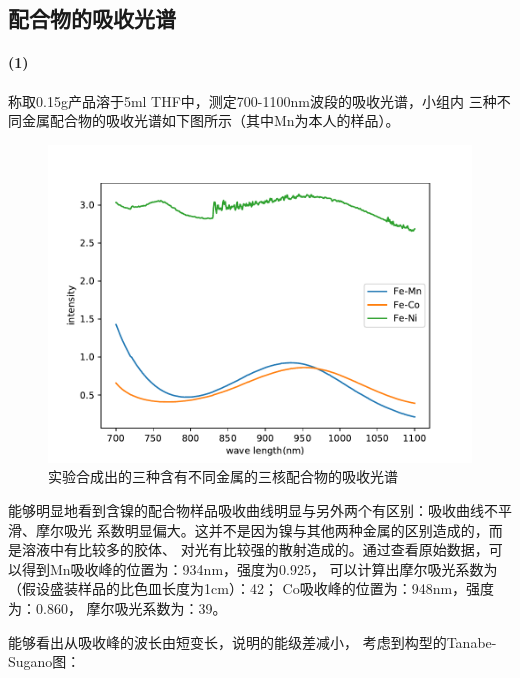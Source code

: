 \documentclass[a4paper,zihao=5,UTF8]{ctexart}
\begin{document}
	\subsection{配合物的吸收光谱}
	\paragraph{(1)}称取0.15g产品溶于5ml THF中，测定700-1100nm波段的吸收光谱，小组内
	三种不同金属配合物的吸收光谱如下图所示（其中Mn为本人的样品）。
	\begin{figure}[htbp]
		\centering
		\includegraphics[scale=0.65]{compare.pdf}
		\caption{实验合成出的三种含有不同金属的三核配合物的吸收光谱}
	\end{figure}
	能够明显地看到含镍的配合物样品吸收曲线明显与另外两个有区别：吸收曲线不平滑、摩尔吸光
	系数明显偏大。这并不是因为镍与其他两种金属的区别造成的，而是溶液中有比较多的胶体、
	对光有比较强的散射造成的。通过查看原始数据，可以得到Mn吸收峰的位置为：934nm，强度为0.925，
	可以计算出摩尔吸光系数为（假设盛装样品的比色皿长度为1cm）：42；
	Co吸收峰的位置为：948nm，强度为：0.860， 摩尔吸光系数为：39。
	\par 
	能够看出从吸收峰的波长由短变长，说明的能级差减小，
	考虑到构型的Tanabe-Sugano图：
\end{document}
